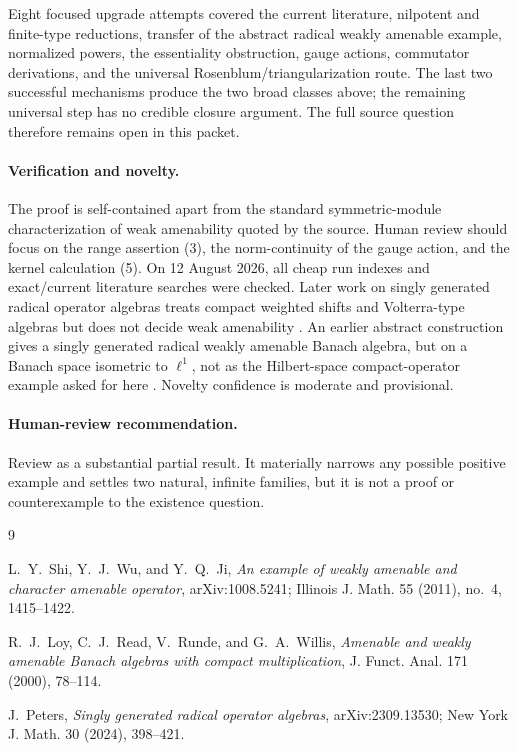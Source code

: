 \documentclass[11pt]{article}
\begin{document}
Eight focused upgrade attempts covered the current literature, nilpotent and
finite-type reductions, transfer of the abstract radical weakly amenable
example, normalized powers, the essentiality obstruction, gauge actions,
commutator derivations, and the universal Rosenblum/triangularization route.
The last two successful mechanisms produce the two broad classes above; the
remaining universal step has no credible closure argument.  The full source
question therefore remains open in this packet.

\paragraph{Verification and novelty.}
The proof is self-contained apart from the standard symmetric-module
characterization of weak amenability quoted by the source.  Human review
should focus on the range assertion (3), the norm-continuity of the gauge
action, and the kernel calculation (5).  On 12 August 2026, all cheap run
indexes and exact/current literature searches were checked.  Later work on
singly generated radical operator algebras treats compact weighted shifts
and Volterra-type algebras but does not decide weak amenability \cite{Peters}.
An earlier abstract construction gives a singly generated radical weakly
amenable Banach algebra, but on a Banach space isometric to \(\ell^1\), not
as the Hilbert-space compact-operator example asked for here \cite{LRRW}.
Novelty confidence is moderate and provisional.

\paragraph{Human-review recommendation.}
Review as a substantial partial result.  It materially narrows any possible
positive example and settles two natural, infinite families, but it is not a
proof or counterexample to the existence question.

\begin{thebibliography}{9}

L.~Y.~Shi, Y.~J.~Wu, and Y.~Q.~Ji,
\emph{An example of weakly amenable and character amenable operator},
arXiv:1008.5241; Illinois J. Math. 55 (2011), no.~4, 1415--1422.

R.~J.~Loy, C.~J.~Read, V.~Runde, and G.~A.~Willis,
\emph{Amenable and weakly amenable Banach algebras with compact
multiplication}, J. Funct. Anal. 171 (2000), 78--114.

J.~Peters,
\emph{Singly generated radical operator algebras},
arXiv:2309.13530; New York J. Math. 30 (2024), 398--421.

\end{thebibliography}
\end{document}
